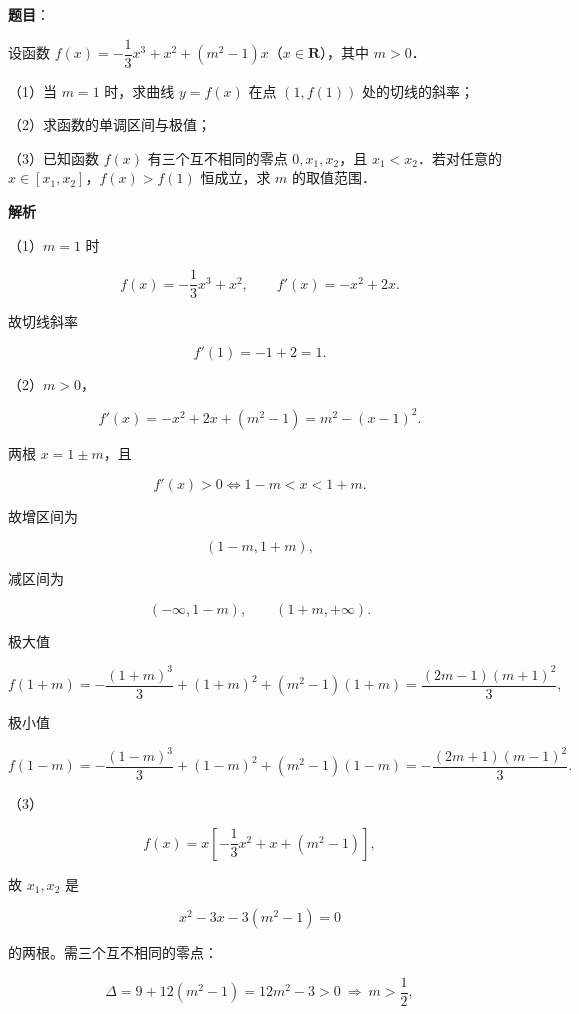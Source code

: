 \begin{answer}

\textbf{题目}：

设函数 $f(x)=-\dfrac13x^3+x^2+(m^2-1)x$（$x\in\mathbf R$），其中 $m>0$．

（1）当 $m=1$ 时，求曲线 $y=f(x)$ 在点 $(1,f(1))$ 处的切线的斜率；

（2）求函数的单调区间与极值；

（3）已知函数 $f(x)$ 有三个互不相同的零点 $0,x_1,x_2$，且 $x_1<x_2$．若对任意的 $x\in[x_1,x_2]$，$f(x)>f(1)$ 恒成立，求 $m$ 的取值范围．

\textbf{解析}

（1）$m=1$ 时

\nopagebreak[4]
\[f(x)=-\frac13x^3+x^2,\qquad f'(x)=-x^2+2x .\]

故切线斜率

\nopagebreak[4]
\[f'(1)=-1+2=1 .\]

（2）$m>0$，

\nopagebreak[4]
\[f'(x)=-x^2+2x+(m^2-1)=m^2-(x-1)^2 .\]

两根 $x=1\pm m$，且

\nopagebreak[4]
\[f'(x)>0\iff 1-m<x<1+m .\]

故增区间为

\nopagebreak[4]
\[(1-m,1+m),\]

减区间为

\nopagebreak[4]
\[(-\infty,1-m),\qquad(1+m,+\infty).\]

极大值

\nopagebreak[4]
\[f(1+m)=-\frac{(1+m)^3}{3}+(1+m)^2+(m^2-1)(1+m)
=\frac{(2m-1)(m+1)^2}{3},\]

极小值

\nopagebreak[4]
\[f(1-m)=-\frac{(1-m)^3}{3}+(1-m)^2+(m^2-1)(1-m)
=-\frac{(2m+1)(m-1)^2}{3}.\]

（3）

\nopagebreak[4]
\[f(x)=x\left[-\frac13x^2+x+(m^2-1)\right],\]

故 $x_1,x_2$ 是

\nopagebreak[4]
\[x^2-3x-3(m^2-1)=0\]

的两根。需三个互不相同的零点：

\nopagebreak[4]
\[\Delta=9+12(m^2-1)=12m^2-3>0\ \Longrightarrow\ m>\frac12,\]


\end{answer}
